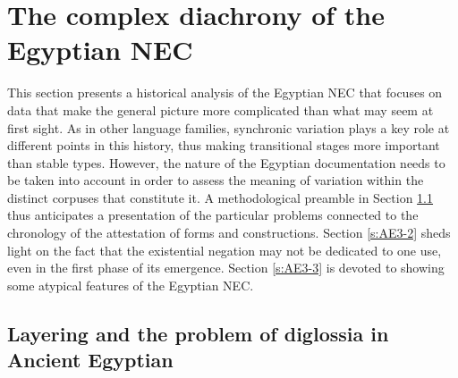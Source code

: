 \documentclass[output=paper]{langsci/langscibook}
\begin{document}
\section{The complex diachrony of the Egyptian NEC}\label{s:AE3}

This section presents a historical analysis of the Egyptian NEC that focuses on data that make the general picture more complicated than what may seem at first sight. As in other language families, synchronic variation plays a key role at different points in this history, thus making transitional stages more important than stable types. However, the nature of the Egyptian documentation needs to be taken into account in order to assess the meaning of variation within the distinct corpuses that constitute it. A methodological preamble in Section \ref{s:AE3-1} thus anticipates a presentation of the particular problems connected to the chronology of the attestation of forms and constructions. Section \ref{s:AE3-2} sheds light on the fact that the existential negation may not be dedicated to one use, even in the first phase of its emergence. Section \ref{s:AE3-3} is devoted to showing some atypical features of the Egyptian NEC.  

\subsection{Layering and the problem of diglossia in Ancient Egyptian}\label{s:AE3-1}
\end{document}
